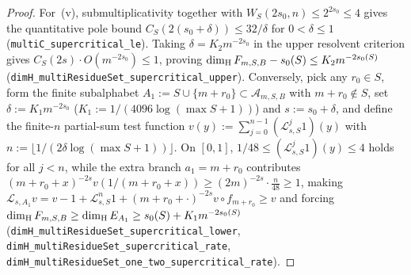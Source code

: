 \begin{proof}
For~(v), submultiplicativity together with $W_S(2s_0,n)\le 2^{2s_0}\le 4$ gives
the quantitative pole bound $C_S(2(s_0+\delta))\le 32/\delta$ for
$0<\delta\le1$ (\texttt{multiC\_\allowbreak supercritical\_\allowbreak le}).
Taking $\delta=K_2 m^{-2s_0}$ in the upper resolvent criterion gives
$C_S(2s)\cdot O(m^{-2s_0})\le 1$, proving
$\dim_{\mathrm{H}} F_{m,S,B}-s_0(S)\le K_2 m^{-2s_0(S)}$
(\texttt{dimH\_\allowbreak multiResidueSet\_\allowbreak supercritical\_\allowbreak upper}).
Conversely, pick any $r_0\in S$, form the finite subalphabet $A_1:=S\cup\{m+r_0\}\subset\mathcal A_{m,S,B}$
with $m+r_0\notin S$, set $\delta:=K_1 m^{-2s_0}$ ($K_1:=1/(4096\log(\max S+1))$)
and $s:=s_0+\delta$, and define the finite-$n$ partial-sum test function
$v(y):=\sum_{j=0}^{n-1}(\mathcal L_{s,S}^j 1)(y)$ with $n:=\lfloor 1/(2\delta\log(\max S+1))\rfloor$.
On $[0,1]$, $1/48\le (\mathcal L_{s,S}^j 1)(y)\le 4$ holds for all $j<n$, while
the extra branch $a_1=m+r_0$ contributes
$(m+r_0+x)^{-2s}v(1/(m+r_0+x))\ge (2m)^{-2s}\cdot\frac{n}{48}\ge 1$, making
$\mathcal L_{s,A_1}v=v-1+\mathcal L_{s,S}^n 1+(m+r_0+\cdot)^{-2s}v\circ f_{m+r_0}\ge v$
and forcing $\dim_{\mathrm{H}} F_{m,S,B}\ge\dim_{\mathrm{H}} E_{A_1}\ge s_0(S)+K_1 m^{-2s_0(S)}$
(\texttt{dimH\_\allowbreak multiResidueSet\_\allowbreak supercritical\_\allowbreak lower},
\texttt{dimH\_\allowbreak multiResidueSet\_\allowbreak supercritical\_\allowbreak rate},
\texttt{dimH\_\allowbreak multiResidueSet\_\allowbreak one\_\allowbreak two\_\allowbreak supercritical\_\allowbreak rate}).
\end{proof}

